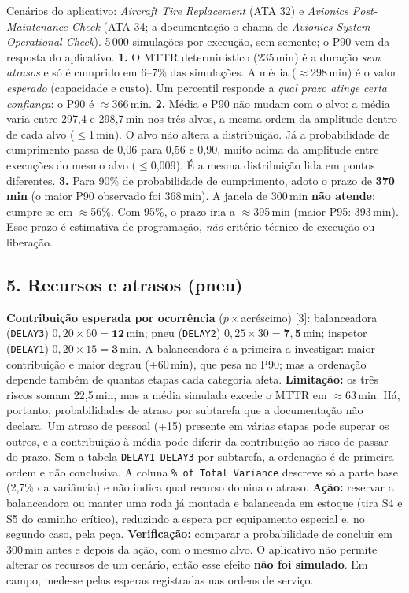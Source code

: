 \documentclass[11pt,a4paper]{article}
\begin{document}
{\footnotesize Cenários do aplicativo: \emph{Aircraft Tire Replacement} (ATA 32) e \emph{Avionics Post-Maintenance Check} (ATA 34; a documentação o chama de \emph{Avionics System Operational Check}). 5\,000 simulações por execução, sem semente; o P90 vem da resposta do aplicativo.}
\textbf{1.} O MTTR determinístico (235\,min) é a duração \emph{sem atrasos} e só é cumprido em 6--7\% das simulações. A média ($\approx$298\,min) é o valor \emph{esperado} (capacidade e custo). Um percentil responde a \emph{qual prazo atinge certa confiança}: o P90 é $\approx$366\,min.
\textbf{2.} Média e P90 não mudam com o alvo: a média varia entre 297,4 e 298,7\,min nos três alvos, a mesma ordem da amplitude dentro de cada alvo ($\le$1\,min). O alvo não altera a distribuição. Já a probabilidade de cumprimento passa de 0,06 para 0,56 e 0,90, muito acima da amplitude entre execuções do mesmo alvo ($\le$0,009). É a mesma distribuição lida em pontos diferentes.
\textbf{3.} Para 90\% de probabilidade de cumprimento, adoto o prazo de \textbf{370\,min} (o maior P90 observado foi 368\,min). A janela de 300\,min \textbf{não atende}: cumpre-se em $\approx$56\%. Com 95\%, o prazo iria a $\approx$395\,min (maior P95: 393\,min). Esse prazo é estimativa de programação, \emph{não} critério técnico de execução ou liberação.

\subsection*{5. Recursos e atrasos (pneu)}
\textbf{Contribuição esperada por ocorrência} ($p\times$acréscimo) [3]: balanceadora (\texttt{DELAY3}) $0{,}20\times60=\mathbf{12}$\,min; pneu (\texttt{DELAY2}) $0{,}25\times30=\mathbf{7{,}5}$\,min; inspetor (\texttt{DELAY1}) $0{,}20\times15=\mathbf{3}$\,min.
A balanceadora é a primeira a investigar: maior contribuição e maior degrau (+60\,min), que pesa no P90; mas a ordenação depende também de quantas etapas cada categoria afeta.
\textbf{Limitação:} os três riscos somam 22,5\,min, mas a média simulada excede o MTTR em $\approx$63\,min. Há, portanto, probabilidades de atraso por subtarefa que a documentação não declara. Um atraso de pessoal (+15) presente em várias etapas pode superar os outros, e a contribuição à média pode diferir da contribuição ao risco de passar do prazo. Sem a tabela \texttt{DELAY1}--\texttt{DELAY3} por subtarefa, a ordenação é de primeira ordem e não conclusiva. A coluna \texttt{\% of Total Variance} descreve só a parte base (2,7\% da variância) e não indica qual recurso domina o atraso.
\textbf{Ação:} reservar a balanceadora ou manter uma roda já montada e balanceada em estoque (tira S4 e S5 do caminho crítico), reduzindo a espera por equipamento especial e, no segundo caso, pela peça.
\textbf{Verificação:} comparar a probabilidade de concluir em 300\,min antes e depois da ação, com o mesmo alvo. O aplicativo não permite alterar os recursos de um cenário, então esse efeito \textbf{não foi simulado}. Em campo, mede-se pelas esperas registradas nas ordens de serviço.
\end{document}
